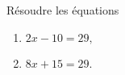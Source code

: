 
\begin{exercice}\label{exo2smath-0242}

    Résoudre les équations
    \begin{enumerate}
        \item
            \( 2x-10=29,\)
        \item
            \( 8x+15=29\).
    \end{enumerate}

\end{exercice}
